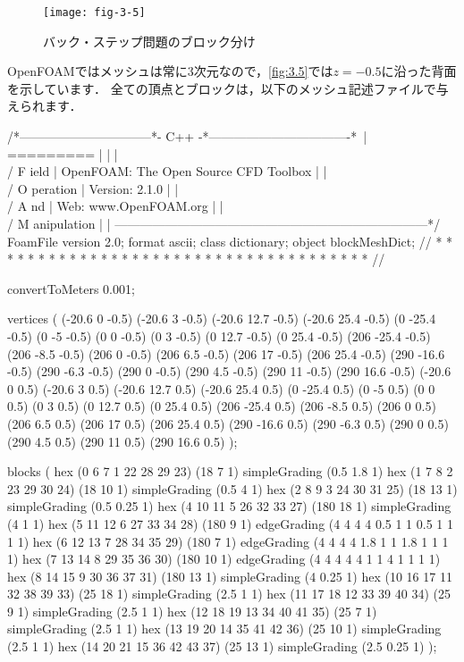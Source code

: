 \begin{figure}[ht]
 \texttt{[image: fig-3-5]}
 \caption{バック・ステップ問題のブロック分け}
 \label{fig:3.5}
\end{figure}


OpenFOAMではメッシュは常に3次元なので，\autoref{fig:3.5}では$z = -0.5$に沿った背面を示しています．
全ての頂点とブロックは，以下のメッシュ記述ファイルで与えられます．
\begin{OFverbatim}
/*--------------------------------*- C++ -*----------------------------------*\
| =========                 |                                                 |
| \\      /  F ield         | OpenFOAM: The Open Source CFD Toolbox           |
|  \\    /   O peration     | Version:  2.1.0                                 |
|   \\  /    A nd           | Web:      www.OpenFOAM.org                      |
|    \\/     M anipulation  |                                                 |
\*---------------------------------------------------------------------------*/
FoamFile
{
    version     2.0;
    format      ascii;
    class       dictionary;
    object      blockMeshDict;
}
// * * * * * * * * * * * * * * * * * * * * * * * * * * * * * * * * * * * * * //

convertToMeters 0.001;

vertices
(
    (-20.6 0 -0.5)
    (-20.6 3 -0.5)
    (-20.6 12.7 -0.5)
    (-20.6 25.4 -0.5)
    (0 -25.4 -0.5)
    (0 -5 -0.5)
    (0 0 -0.5)
    (0 3 -0.5)
    (0 12.7 -0.5)
    (0 25.4 -0.5)
    (206 -25.4 -0.5)
    (206 -8.5 -0.5)
    (206 0 -0.5)
    (206 6.5 -0.5)
    (206 17 -0.5)
    (206 25.4 -0.5)
    (290 -16.6 -0.5)
    (290 -6.3 -0.5)
    (290 0 -0.5)
    (290 4.5 -0.5)
    (290 11 -0.5)
    (290 16.6 -0.5)
    (-20.6 0 0.5)
    (-20.6 3 0.5)
    (-20.6 12.7 0.5)
    (-20.6 25.4 0.5)
    (0 -25.4 0.5)
    (0 -5 0.5)
    (0 0 0.5)
    (0 3 0.5)
    (0 12.7 0.5)
    (0 25.4 0.5)
    (206 -25.4 0.5)
    (206 -8.5 0.5)
    (206 0 0.5)
    (206 6.5 0.5)
    (206 17 0.5)
    (206 25.4 0.5)
    (290 -16.6 0.5)
    (290 -6.3 0.5)
    (290 0 0.5)
    (290 4.5 0.5)
    (290 11 0.5)
    (290 16.6 0.5)
);

blocks
(
    hex (0 6 7 1 22 28 29 23) (18 7 1) simpleGrading (0.5 1.8 1)
    hex (1 7 8 2 23 29 30 24) (18 10 1) simpleGrading (0.5 4 1)
    hex (2 8 9 3 24 30 31 25) (18 13 1) simpleGrading (0.5 0.25 1)
    hex (4 10 11 5 26 32 33 27) (180 18 1) simpleGrading (4 1 1)
    hex (5 11 12 6 27 33 34 28) (180 9 1) edgeGrading (4 4 4 4 0.5 1 1 0.5 1 1 1 1)
    hex (6 12 13 7 28 34 35 29) (180 7 1) edgeGrading (4 4 4 4 1.8 1 1 1.8 1 1 1 1)
    hex (7 13 14 8 29 35 36 30) (180 10 1) edgeGrading (4 4 4 4 4 1 1 4 1 1 1 1)
    hex (8 14 15 9 30 36 37 31) (180 13 1) simpleGrading (4 0.25 1)
    hex (10 16 17 11 32 38 39 33) (25 18 1) simpleGrading (2.5 1 1)
    hex (11 17 18 12 33 39 40 34) (25 9 1) simpleGrading (2.5 1 1)
    hex (12 18 19 13 34 40 41 35) (25 7 1) simpleGrading (2.5 1 1)
    hex (13 19 20 14 35 41 42 36) (25 10 1) simpleGrading (2.5 1 1)
    hex (14 20 21 15 36 42 43 37) (25 13 1) simpleGrading (2.5 0.25 1)
);


\end{OFverbatim}
